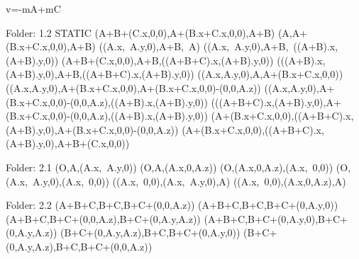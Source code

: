 v=-mA+mC

Folder: 1.2 STATIC
\left(A+B+\left(C.x,0,0\right),A+\left(B.x+C.x,0,0\right),A+B\right)
\left(A,A+\left(B.x+C.x,0,0\right),A+B\right)
\left(\left(A.x,\ A.y,0\right),A+B,\ A\right)
\left(\left(A.x,\ A.y,0\right),A+B,\ \left(\left(A+B\right).x,\left(A+B\right).y,0\right)\right)
\left(A+B+\left(C.x,0,0\right),A+B,\left(\left(A+B+C\right).x,\left(A+B\right).y,0\right)\right)
\left(\left(\left(A+B\right).x,\left(A+B\right).y,0\right),A+B,\left(\left(A+B+C\right).x,\left(A+B\right).y,0\right)\right)
\left(\left(A.x,A.y,0\right),A,A+\left(B.x+C.x,0,0\right)\right)
\left(\left(A.x,A.y,0\right),A+\left(B.x+C.x,0,0\right),A+\left(B.x+C.x,0,0\right)-\left(0,0,A.z\right)\right)
\left(\left(A.x,A.y,0\right),A+\left(B.x+C.x,0,0\right)-\left(0,0,A.z\right),\left(\left(A+B\right).x,\left(A+B\right).y,0\right)\right)
\left(\left(\left(A+B+C\right).x,\left(A+B\right).y,0\right),A+\left(B.x+C.x,0,0\right)-\left(0,0,A.z\right),\left(\left(A+B\right).x,\left(A+B\right).y,0\right)\right)
\left(A+\left(B.x+C.x,0,0\right),\left(\left(A+B+C\right).x,\left(A+B\right).y,0\right),A+\left(B.x+C.x,0,0\right)-\left(0,0,A.z\right)\right)
\left(A+\left(B.x+C.x,0,0\right),\left(\left(A+B+C\right).x,\left(A+B\right).y,0\right),A+B+\left(C.x,0,0\right)\right)

Folder: 2.1
\left(O,A,\left(A.x,\ A.y,0\right)\right)
\left(O,A,\left(A.x,0,A.z\right)\right)
\left(O,\left(A.x,0,A.z\right),\left(A.x,\ 0,0\right)\right)
\left(O,\left(A.x,\ A.y,0\right),\left(A.x,\ 0,0\right)\right)
\left(\left(A.x,\ 0,0\right),\left(A.x,\ A.y,0\right),A\right)
\left(\left(A.x,\ 0,0\right),\left(A.x,0,A.z\right),A\right)

Folder: 2.2
\left(A+B+C,B+C,B+C+\left(0,0,A.z\right)\right)
\left(A+B+C,B+C,B+C+\left(0,A.y,0\right)\right)
\left(A+B+C,B+C+\left(0,0,A.z\right),B+C+\left(0,A.y,A.z\right)\right)
\left(A+B+C,B+C+\left(0,A.y,0\right),B+C+\left(0,A.y,A.z\right)\right)
\left(B+C+\left(0,A.y,A.z\right),B+C,B+C+\left(0,A.y,0\right)\right)
\left(B+C+\left(0,A.y,A.z\right),B+C,B+C+\left(0,0,A.z\right)\right)

